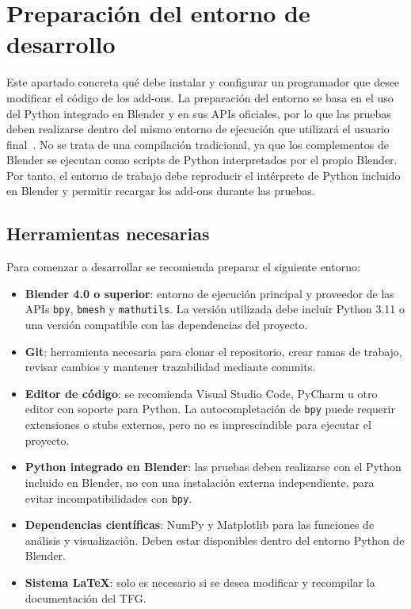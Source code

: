 \section{Preparación del entorno de desarrollo}
\label{sec:d-entorno-desarrollo}

Este apartado concreta qué debe instalar y configurar un programador que desee modificar el código de los add-ons. La preparación del entorno se basa en el uso del Python integrado en Blender y en sus APIs oficiales, por lo que las pruebas deben realizarse dentro del mismo entorno de ejecución que utilizará el usuario final~\cite{blenderapi,pythonlang}. No se trata de una compilación tradicional, ya que los complementos de Blender se ejecutan como scripts de Python interpretados por el propio Blender. Por tanto, el entorno de trabajo debe reproducir el intérprete de Python incluido en Blender y permitir recargar los add-ons durante las pruebas.

\subsection{Herramientas necesarias}
\label{subsec:d-herramientas-necesarias}

Para comenzar a desarrollar se recomienda preparar el siguiente entorno:

\begin{itemize}
    \item \textbf{Blender 4.0 o superior}: entorno de ejecución principal y proveedor de las APIs \texttt{bpy}, \texttt{bmesh} y \texttt{mathutils}. La versión utilizada debe incluir Python 3.11 o una versión compatible con las dependencias del proyecto.
    \item \textbf{Git}: herramienta necesaria para clonar el repositorio, crear ramas de trabajo, revisar cambios y mantener trazabilidad mediante commits.
    \item \textbf{Editor de código}: se recomienda Visual Studio Code, PyCharm u otro editor con soporte para Python. La autocompletación de \texttt{bpy} puede requerir extensiones o stubs externos, pero no es imprescindible para ejecutar el proyecto.
    \item \textbf{Python integrado en Blender}: las pruebas deben realizarse con el Python incluido en Blender, no con una instalación externa independiente, para evitar incompatibilidades con \texttt{bpy}.
    \item \textbf{Dependencias científicas}: NumPy y Matplotlib para las funciones de análisis y visualización. Deben estar disponibles dentro del entorno Python de Blender.
    \item \textbf{Sistema \LaTeX}: solo es necesario si se desea modificar y recompilar la documentación del TFG.
\end{itemize}


